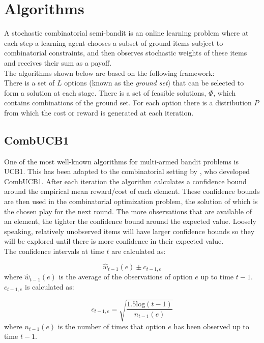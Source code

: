 \pagebreak


\section{Algorithms}

A stochastic combinatorial semi-bandit is an online learning problem where at each step a learning agent chooses a subset of ground items subject to combinatorial constraints, and then observes stochastic weights of these items and receives their sum as a payoff.\\
The algorithms shown below are based on the following framework:\\There is a set of $L$ options (known as the \emph{ground set}) that can be selected to form a solution at each stage. There is a set of feasible solutions, $\Phi$, which contains combinations of the ground set. For each option there is a distribution $P$ from which the cost or reward is generated at each iteration.

\subsection{CombUCB1}

One of the most well-known algorithms for multi-armed bandit problems is UCB1. This has been adapted to the combinatorial setting by \cite{kveton2015tight}, who developed CombUCB1. After each iteration the algorithm calculates a confidence bound around the empirical mean reward/cost of each element. These confidence bounds are then used in the combinatorial optimization problem, the solution of which is the chosen play for the next round. The more observations that are available of an element, the tighter the confidence bound around the expected value. Loosely speaking, relatively unobserved items will have larger confidence bounds so they will be explored until there is more confidence in their expected value.\\

The confidence intervals at time $t$ are calculated as:

$$\hat{w}_{t-1}(e)\pm c_{t-1,e}$$ where $\hat{w}_{t-1}(e)$ is the average of the observations of option $e$ up to time $t-1$. $c_{t-1,e}$ is calculated as:

$$c_{t-1,e}=\sqrt{\frac{1.5\textrm{log}(t-1)}{n_{t-1}(e)}}$$ where $n_{t-1}(e)$ is the number of times that option $e$ has been observed up to time $t-1$.\\

